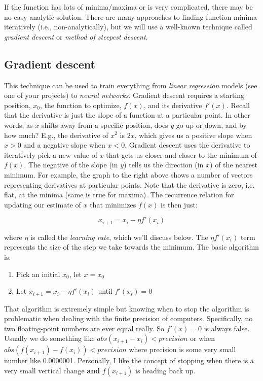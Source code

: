 \documentclass[titlepage]{tufte-book}
\newcounter{problem}
\begin{document}
\begin{fullwidth}
If the function has lots of minima/maxima or is very complicated, there may be no easy analytic solution.
There are many approaches to finding function minima iteratively (i.e., non-analytically), but we will use a well-known technique called {\em gradient descent} or {\em method of steepest descent}.  

\subsection{Gradient descent}

This technique can be used to train everything from {\em linear regression} models (see one of your projects) to {\em neural networks}.  Gradient descent requires a starting position, $x_0$, the function to optimize, $f(x)$, and its derivative $f'(x)$.  Recall that the derivative is just the slope of a function at a particular point. In other words, as $x$ shifts away from a specific position, does $y$ go up or down, and by how much?  E.g., the derivative of $x^2$ is $2x$, which gives us a positive slope when $x>0$ and a negative slope when $x<0$.  Gradient descent uses the derivative to iteratively pick a new value of $x$ that gets us closer and closer to the minimum of $f(x)$.   The negative of the slope (in $y$) tells us the direction (in $x$) of the nearest minimum. For example, the graph to the right above shows a number of vectors representing derivatives at particular points. Note that the derivative is zero, i.e. flat, at the minima (same is true for maxima). The recurrence relation for updating our estimate of $x$ that minimizes $f(x)$ is then just:

\[
x_{i+1} = x_i - \eta f'(x_i)
\]

\noindent where $\eta$ is called the {\em learning rate}, which we'll discuss below. The $\eta f'(x_{i})$ term represents the size of the step we take towards the minimum. 
The basic algorithm is:

\begin{enumerate}
\item Pick an initial $x_0$, let $x = x_0$
\item Let $x_{i+1} = x_i - \eta f'(x_i)$ until $f'(x_i)=0$
\end{enumerate}

That algorithm is extremely simple but knowing when to stop the algorithm is problematic when dealing with the finite precision of computers. Specifically, no two floating-point numbers are ever equal really. So $f'(x) = 0$ is always false. Usually we do something like $abs(x_{i+1} - x_i) < precision$ or when $abs(f(x_{i+1}) - f(x_i)) < precision$ where precision is some very small number like 0.0000001.  Personally, I like the concept of stopping when there is a very small vertical change {\bf and} $f(x_{i+1})$ is heading back up.


\end{fullwidth}
\end{document}
